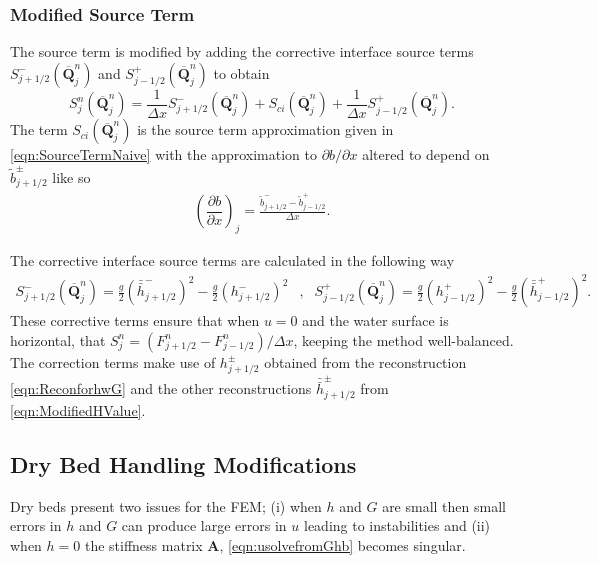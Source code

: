 \documentclass[times]{elsarticle}
\newcommand{\matr}[1]{\mathbf{#1}}
\newcommand{\vecn}[1]{\boldsymbol{#1}}
\begin{document}
\subsubsection{Modified Source Term}
The source term is modified by adding the corrective interface source terms $S^{-}_{j + 1/2}\left(\overline{\vecn{Q} }^{n}_j \right)$ and $S^{+}_{j - 1/2}\left(\overline{\vecn{Q} }^{n}_j \right)$ to obtain
\begin{equation*}
S^n_j\left(\overline{\vecn{Q} }^{n}_j \right)  =  \frac{1}{\Delta x}S^{-}_{j + 1/2}\left(\overline{\vecn{Q} }^{n}_j \right)  +  S_{ci}\left(\overline{\vecn{Q} }^{n}_j \right)  +  \frac{1}{\Delta x}S^{+}_{j - 1/2}\left(\overline{\vecn{Q} }^{n}_j \right) .
\end{equation*}
The term $S_{ci}\left(\overline{\vecn{Q} }^{n}_j \right) $ is the source term approximation given in \eqref{eqn:SourceTermNaive} with the approximation to $\partial b / \partial x$ altered to depend on $\tilde{b}^\pm_{j+1/2}$ like so
\begin{align*}
\left(\dfrac{\partial {b}}{\partial x} \right)_{j} =  \frac{\tilde{b}^-_{j+1/2} - \tilde{b}^+_{j-1/2}}{\Delta x}.
\end{align*}

The corrective interface source terms are calculated in the following way
\begin{align*}
S^{-}_{j + 1/2}\left(\overline{\vecn{Q} }^{n}_j \right)  =  \frac{g}{2} \left(\bar{\bar{h}}^{-}_{j + 1/2} \right)^2 - \frac{g}{2} \left(h^{-}_{j + 1/2} \right)^2&,&
S^{+}_{j - 1/2}\left(\overline{\vecn{Q} }^{n}_j \right)  =  \frac{g}{2} \left(h^{+}_{j - 1/2}\right)^2 - \frac{g}{2}\left(\bar{\bar{h}}^{+}_{j - 1/2}\right)^2 .
\end{align*}
These corrective terms ensure that when $u=0$ and the water surface is horizontal, that $S^n_j = \left(F^n_{j+1/2} - F^n_{j-1/2} \right) / \Delta x$, keeping the method well-balanced. The correction terms make use of $h^{\pm}_{j + 1/2}$ obtained from the reconstruction \eqref{eqn:ReconforhwG} and the other reconstructions $\bar{\bar{h}}^{\pm}_{j + 1/2}$ from \eqref{eqn:ModifiedHValue}.

\subsection{Dry Bed Handling Modifications}
Dry beds present two issues for the FEM; (i) when $h$ and $G$ are small then small errors in $h$ and $G$ can produce large errors in $u$ leading to instabilities and  (ii) when $h=0$ the stiffness matrix $\matr{A}$, \eqref{eqn:usolvefromGhb} becomes singular.
\end{document}
